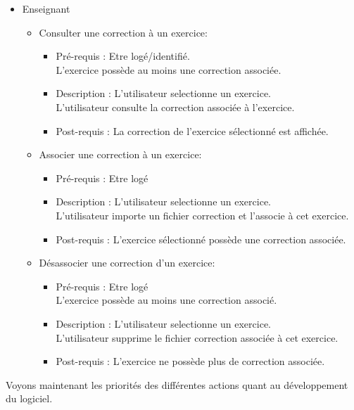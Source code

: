 	\begin{itemize}
	\item Enseignant
		\begin{itemize}
		\item Consulter une correction {\`a} un exercice:
			\begin{itemize}
			\item Pr{\'e}-requis : Etre log{\'e}/identifi{\'e}.\\
			L'exercice poss{\`e}de au moins une correction associ{\'e}e.
			\item Description :  L'utilisateur selectionne un exercice.\\
			L'utilisateur consulte la correction associ{\'e}e {\`a} l'exercice.
			\item Post-requis : La correction de l'exercice s{\'e}lectionn{\'e} est affich{\'e}e.
			\end{itemize}

		\item Associer une correction {\`a} un exercice:
			\begin{itemize}
			\item Pr{\'e}-requis : Etre log{\'e}
			\item Description :  L'utilisateur selectionne un exercice.\\
			L'utilisateur importe un fichier correction et l'associe {\`a} cet exercice.
			\item Post-requis : L'exercice s{\'e}lectionn{\'e} poss{\`e}de une correction associ{\'e}e.
			\end{itemize}

		\item D{\'e}sassocier une correction d'un exercice:
			\begin{itemize}
			\item Pr{\'e}-requis : Etre log{\'e}\\
			L'exercice poss{\`e}de au moins une correction associ{\'e}.
			\item Description : L'utilisateur selectionne un exercice.\\
			L'utilisateur supprime le fichier correction associ{\'e}e {\`a} cet exercice.
			\item Post-requis : L'exercice ne poss{\`e}de plus de correction associ{\'e}e.\\
			\end{itemize}
			
		\end{itemize}
	\end{itemize}
\newpage
Voyons maintenant les priorit{\'e}s des diff{\'e}rentes actions quant au
d{\'e}veloppement du logiciel.\\\\\\

